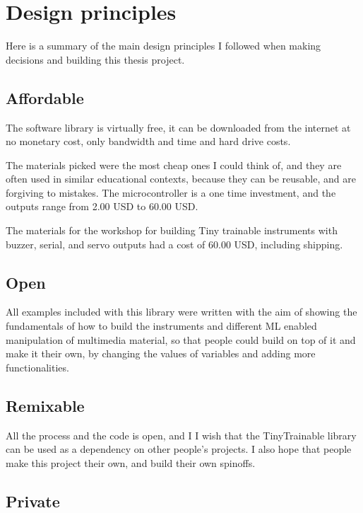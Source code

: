 \section{Design principles}

Here is a summary of the main design principles I followed when making decisions and building this thesis project.

\subsection{Affordable}

The software library is virtually free, it can be downloaded from the internet at no monetary cost, only bandwidth and time and hard drive costs.

The materials picked were the most cheap ones I could think of, and they are often used in similar educational contexts, because they can be reusable, and are forgiving to mistakes. The microcontroller is a one time investment, and the outputs range from 2.00 USD to 60.00 USD. 

The materials for the workshop for building Tiny trainable instruments with buzzer, serial, and servo outputs had a cost of 60.00 USD, including shipping.

\subsection{Open}

All examples included with this library were written with the aim of showing the fundamentals of how to build the instruments and different \acrshort{ML} enabled manipulation of multimedia material, so that people could build on top of it and make it their own, by changing the values of variables and adding more functionalities.

\subsection{Remixable}

All the process and the code is open, and I I wish that the TinyTrainable library can be used as a dependency on other people's projects. I also hope that people make this project their own, and build their own spinoffs. 

\subsection{Private}

